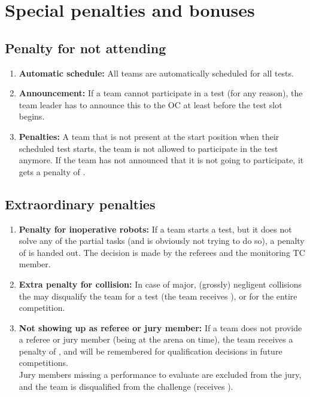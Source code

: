 \newcommand{\penaltybig}{15~}
\newcommand{\penaltysmall}{5~}


\section{Special penalties and bonuses}\label{sec:special_awards}

\subsection{Penalty for not attending}\label{rule:not_attending}
\begin{enumerate}
	\item \textbf{Automatic schedule:} All teams are automatically scheduled for all tests.
	\item \textbf{Announcement:} If a team cannot participate in a test (for any reason), the team leader has to announce this to the OC at least  before the test slot begins.
	\item \textbf{Penalties:} A team that is not present at the start position when their scheduled test starts, the team is not allowed to participate in the test anymore. If the team has not announced that it is not going to participate, it gets a penalty of \scoring{\penaltybig points}. 
\end{enumerate}

\subsection{Extraordinary penalties}\label{rule:extraordinary_penalties}
\begin{enumerate}
	\item \textbf{Penalty for inoperative robots:} If a team starts a test, but it does not solve any of the partial tasks (and is obviously not trying to do so), a penalty of \scoring{\penaltysmall points} is handed out. The decision is made by the referees and the monitoring TC member.  
	\item \textbf{Extra penalty for collision:} In case of major, (grossly) negligent collisions the  may disqualify the team for a test (the team receives ), or for the entire competition.
	\item \textbf{Not showing up as referee or jury member:} If a team does not provide a referee or jury member (being at the arena on time), the team receives a penalty of \scoring{\penaltybig points}, and will be remembered for qualification decisions in future competitions.\\
	Jury members missing a performance to evaluate are excluded from the jury, and the team is 	disqualified from the challenge (receives ).
\end{enumerate}


